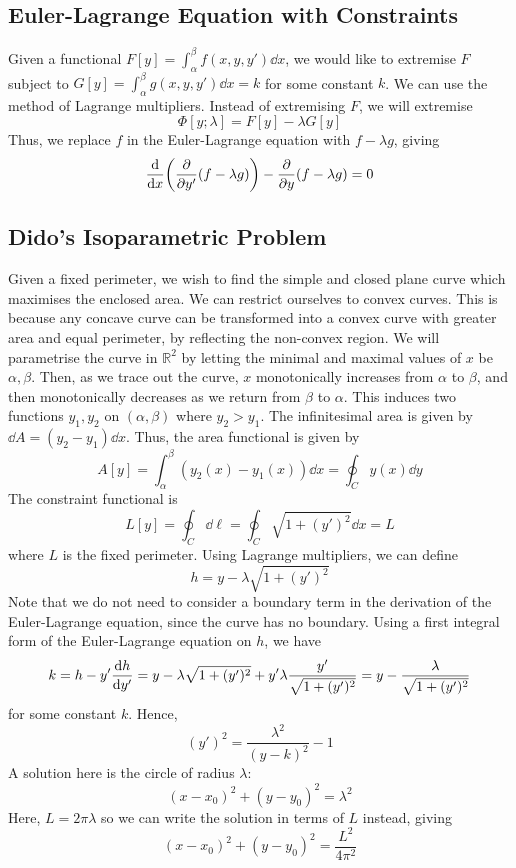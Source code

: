 \subsection{Euler-Lagrange Equation with Constraints}
Given a functional \( F[y] = \int_\alpha^\beta f(x,y,y') \dd{x} \), we would like to extremise \( F \) subject to \( G[y] = \int_\alpha^\beta g(x,y,y') \dd{x} = k \) for some constant \( k \).
We can use the method of Lagrange multipliers.
Instead of extremising \( F \), we will extremise
\[
	\Phi[y;\lambda] = F[y] - \lambda G[y]
\]
Thus, we replace \( f \) in the Euler-Lagrange equation with \( f - \lambda g \), giving
\[
	\dv{x}\qty(\pdv{y'}(f-\lambda g)) - \pdv{y}(f-\lambda g) = 0
\]

\subsection{Dido's Isoparametric Problem}
Given a fixed perimeter, we wish to find the simple and closed plane curve which maximises the enclosed area.
We can restrict ourselves to convex curves.
This is because any concave curve can be transformed into a convex curve with greater area and equal perimeter, by reflecting the non-convex region.
We will parametrise the curve in \( \mathbb R^2 \) by letting the minimal and maximal values of \( x \) be \( \alpha, \beta \).
Then, as we trace out the curve, \( x \) monotonically increases from \( \alpha \) to \( \beta \), and then monotonically decreases as we return from \( \beta \) to \( \alpha \).
This induces two functions \( y_1, y_2 \) on \( (\alpha, \beta) \) where \( y_2 > y_1 \).
The infinitesimal area is given by \( \dd{A} = (y_2 - y_1) \dd{x} \).
Thus, the area functional is given by
\[
	A[y] = \int_\alpha^\beta (y_2(x) - y_1(x))\dd{x} = \oint_C y(x) \dd{y}
\]
The constraint functional is
\[
	L[y] = \oint_C \dd{\ell} = \oint_C \sqrt{1 + (y')^2} \dd{x} = L
\]
where \( L \) is the fixed perimeter.
Using Lagrange multipliers, we can define
\[
	h = y - \lambda \sqrt{1 + (y')^2}
\]
Note that we do not need to consider a boundary term in the derivation of the Euler-Lagrange equation, since the curve has no boundary.
Using a first integral form of the Euler-Lagrange equation on \( h \), we have
\[
	k = h - y'\dv{h}{y'} = y - \lambda \sqrt{1 + (y')^2} + y' \lambda \frac{y'}{\sqrt{1 + (y')^2}} = y - \frac{\lambda}{\sqrt{1 + (y')^2}}
\]
for some constant \( k \).
Hence,
\[
	(y')^2 = \frac{\lambda^2}{(y - k)^2} - 1
\]
A solution here is the circle of radius \( \lambda \):
\[
	(x - x_0)^2 + (y - y_0)^2 = \lambda^2
\]
Here, \( L = 2 \pi \lambda \) so we can write the solution in terms of \( L \) instead, giving
\[
	(x - x_0)^2 + (y - y_0)^2 = \frac{L^2}{4\pi^2}
\]

